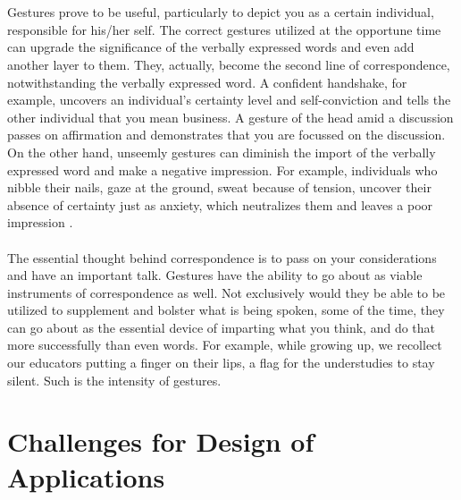 \documentclass{article}
\begin{document}
\\\\
Gestures prove to be useful, particularly to depict you as a certain individual, responsible for his/her self. The correct gestures utilized at the opportune time can upgrade the significance of the verbally expressed words and even add another layer to them. They, actually, become the second line of correspondence, notwithstanding the verbally expressed word. A confident handshake, for example, uncovers an individual's certainty level and self-conviction and tells the other individual that you mean business. A gesture of the head amid a discussion passes on affirmation and demonstrates that you are focussed on the discussion. On the other hand, unseemly gestures can diminish the import of the verbally expressed word and make a negative impression. For example, individuals who nibble their nails, gaze at the ground, sweat because of tension, uncover their absence of certainty just as anxiety, which neutralizes them and leaves a poor impression \cite{wu2007iconic}.
\\\\
The essential thought behind correspondence is to pass on your considerations and have an important talk. Gestures have the ability to go about as viable instruments of correspondence as well. Not exclusively would they be able to be utilized to supplement and bolster what is being spoken, some of the time, they can go about as the essential device of imparting what you think, and do that more successfully than even words. \cite{krauss1996nonverbal} For example, while growing up, we recollect our educators putting a finger on their lips, a flag for the understudies to stay silent. Such is the intensity of gestures.

\section{Challenges for Design of Applications}
\end{document}
